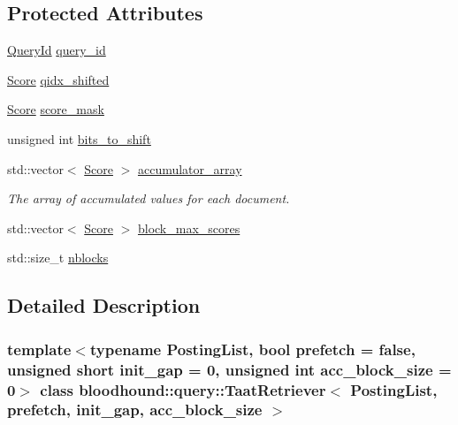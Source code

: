 \subsection*{Protected Attributes}
\begin{DoxyCompactItemize}
\item 
\hyperlink{namespacebloodhound_1_1query_aa67214af106292b2483995adea986b08}{Query\+Id} \hyperlink{classbloodhound_1_1query_1_1TaatRetriever_aa9a1b8ca0cb570bcffe6b6c68e8c2e20}{query\+\_\+id}
\item 
\hyperlink{structbloodhound_1_1Score}{Score} \hyperlink{classbloodhound_1_1query_1_1TaatRetriever_aa27d16b326df60affe26e005f9abb4f6}{qidx\+\_\+shifted}
\item 
\hyperlink{structbloodhound_1_1Score}{Score} \hyperlink{classbloodhound_1_1query_1_1TaatRetriever_ac38b873ceff34b55bb8ac82800946825}{score\+\_\+mask}
\item 
unsigned int \hyperlink{classbloodhound_1_1query_1_1TaatRetriever_aa2b4875de4f02a856e64560bf002296f}{bits\+\_\+to\+\_\+shift}
\item 
std\+::vector$<$ \hyperlink{structbloodhound_1_1Score}{Score} $>$ \hyperlink{classbloodhound_1_1query_1_1TaatRetriever_a604c7ab279ced03ccc1866d55c844b11}{accumulator\+\_\+array}
\begin{DoxyCompactList}\small\item\em The array of accumulated values for each document. \end{DoxyCompactList}\item 
std\+::vector$<$ \hyperlink{structbloodhound_1_1Score}{Score} $>$ \hyperlink{classbloodhound_1_1query_1_1TaatRetriever_ac870574844dc3be6c40cf1236e1ff6cc}{block\+\_\+max\+\_\+scores}
\item 
std\+::size\+\_\+t \hyperlink{classbloodhound_1_1query_1_1TaatRetriever_a87786d9af7993da498d60304eab245cf}{nblocks}
\end{DoxyCompactItemize}


\subsection{Detailed Description}
\subsubsection*{template$<$typename Posting\+List, bool prefetch = false, unsigned short init\+\_\+gap = 0, unsigned int acc\+\_\+block\+\_\+size = 0$>$\newline
class bloodhound\+::query\+::\+Taat\+Retriever$<$ Posting\+List, prefetch, init\+\_\+gap, acc\+\_\+block\+\_\+size $>$}

